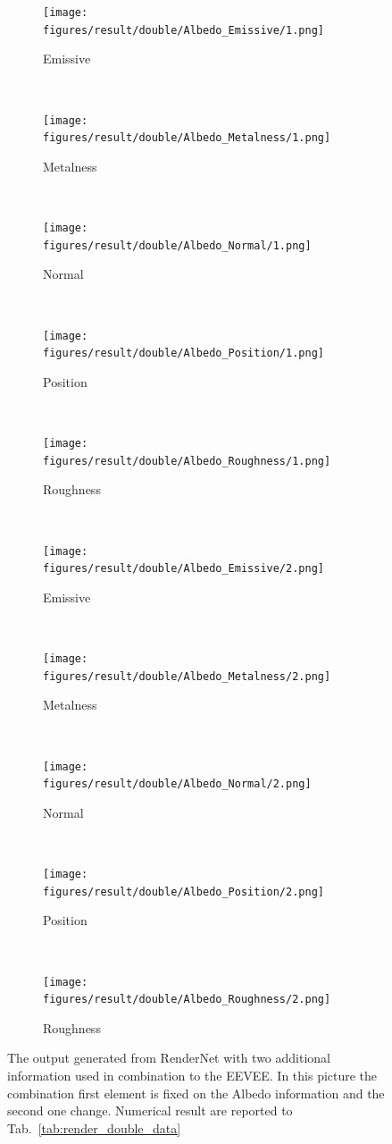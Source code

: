 \begin{figure}[h!]
    \centering
    \begin{subfigure}[b]{0.175\textwidth}
     \texttt{[image: figures/result/double/Albedo\_Emissive/1.png]}
     \caption{Emissive}\label{subfig:1}
    \end{subfigure}
    ~
    \begin{subfigure}[b]{0.175\textwidth}
     \texttt{[image: figures/result/double/Albedo\_Metalness/1.png]}
     \caption{Metalness}
    \end{subfigure}
    ~
    \begin{subfigure}[b]{0.175\textwidth}
     \texttt{[image: figures/result/double/Albedo\_Normal/1.png]}
     \caption{Normal}
    \end{subfigure}
    ~
    \begin{subfigure}[b]{0.175\textwidth}
     \texttt{[image: figures/result/double/Albedo\_Position/1.png]}
     \caption{Position}
    \end{subfigure}
    ~
    \begin{subfigure}[b]{0.175\textwidth}
     \texttt{[image: figures/result/double/Albedo\_Roughness/1.png]}
     \caption{Roughness}
    \end{subfigure}
    \\ \vspace{0.2cm} %
    \begin{subfigure}[b]{0.175\textwidth}
     \texttt{[image: figures/result/double/Albedo\_Emissive/2.png]}
     \caption{Emissive}
     \label{subfig:1}
    \end{subfigure}
    ~
    \begin{subfigure}[b]{0.175\textwidth}
     \texttt{[image: figures/result/double/Albedo\_Metalness/2.png]}
     \caption{Metalness}
    \end{subfigure}
    ~
    \begin{subfigure}[b]{0.175\textwidth}
     \texttt{[image: figures/result/double/Albedo\_Normal/2.png]}
     \caption{Normal}
    \end{subfigure}
    ~
    \begin{subfigure}[b]{0.175\textwidth}
     \texttt{[image: figures/result/double/Albedo\_Position/2.png]}
     \caption{Position}
    \end{subfigure}
    ~
    \begin{subfigure}[b]{0.175\textwidth}
     \texttt{[image: figures/result/double/Albedo\_Roughness/2.png]}
     \caption{Roughness}
    \end{subfigure}
    \caption{The output generated from RenderNet with two additional information used in combination to the EEVEE. In this picture the combination first element is fixed on the Albedo information and the second one change. Numerical result are reported to Tab.~\ref{tab:render_double_data}}
    \label{fig:double_input_base_albedo_generation}
\end{figure}

